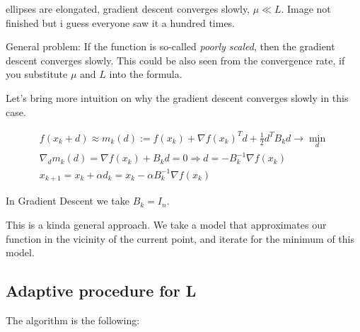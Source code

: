 \example \; ellipses are elongated, gradient descent converges slowly, $\mu \ll L$. Image not finished but i guess everyone saw it a hundred times.

\begin{center}
\end{center}

\notice \; General problem: If the function is so-called \textit{poorly scaled}, then the gradient descent converges slowly. This could be also seen from the convergence rate, if you substitute $\mu$ and $L$ into the formula.

Let's bring more intuition on why the gradient descent converges slowly in this case. 

\begin{gather*}
    f(x_k + d) \approx m_k(d) := f(x_k) + \nabla f(x_k)^T d + \frac{1}{2} d^T B_k d \to \min_{d} \\ 
    \nabla_d m_k(d) = \nabla f(x_k) + B_k d = 0 \Longrightarrow d = -B_k^{-1} \nabla f(x_k) \\ 
    x_{k+1} = x_k + \alpha d_k = x_k - \alpha B_k^{-1} \nabla f(x_k)
\end{gather*}

\notice \; In Gradient Descent we take $B_k = I_n$. 

This is a kinda general approach. We take a model that approximates our function in the vicinity of the current point, and iterate for the minimum of this model.

\newpage

\subsection{Adaptive procedure for L}

The algorithm is the following:

